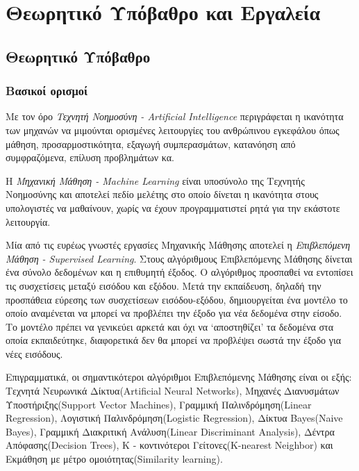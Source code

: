 \thispagestyle{plain}
\chapter{Θεωρητικό Υπόβαθρο και Εργαλεία}
\label{chap:3}

\section{Θεωρητικό Υπόβαθρο}
\label{sec:3.1}

\subsection{Βασικοί ορισμοί}
\label{subsec:3.1.1}

Με τον όρο \textit{Τεχνητή Νοημοσύνη - Artificial Intelligence} περιγράφεται η ικανότητα των μηχανών να μιμούνται ορισμένες λειτουργίες του ανθρώπινου εγκεφάλου όπως  μάθηση, προσαρμοστικότητα, εξαγωγή συμπερασμάτων, κατανόηση από συμφραζόμενα, επίλυση προβλημάτων κα.

 Η \textit{Μηχανική Μάθηση - Machine Learning} είναι υποσύνολο της Τεχνητής Νοημοσύνης και αποτελεί πεδίο μελέτης στο οποίο δίνεται η ικανότητα στους υπολογιστές να μαθαίνουν, χωρίς να έχουν προγραμματιστεί ρητά για την εκάστοτε λειτουργία. 
 
Μία από τις ευρέως γνωστές εργασίες Μηχανικής Μάθησης αποτελεί η \textit{Επιβλεπόμενη Μάθηση - Supervised Learning}. Στους αλγόριθμους Επιβλεπόμενης Μάθησης δίνεται ένα σύνολο δεδομένων και η επιθυμητή έξοδος. Ο αλγόριθμος προσπαθεί να εντοπίσει τις συσχετίσεις μεταξύ εισόδου και εξόδου. Μετά την εκπαίδευση, δηλαδή την προσπάθεια εύρεσης των συσχετίσεων εισόδου-εξόδου, δημιουργείται ένα μοντέλο το οποίο αναμένεται να μπορεί να προβλέπει την έξοδο για νέα δεδομένα στην είσοδο. Το μοντέλο πρέπει να γενικεύει αρκετά και όχι να ‘αποστηθίζει’ τα δεδομένα στα οποία εκπαιδεύτηκε, διαφορετικά δεν θα μπορεί να προβλέψει σωστά την έξοδο για νέες εισόδους. 


Επιγραμματικά, οι σημαντικότεροι αλγόριθμοι Επιβλεπόμενης Μάθησης είναι οι εξής: Τεχνητά Νευρωνικά Δίκτυα(Artificial Neural Networks), Μηχανές Διανυσμάτων Υποστήριξης(Support Vector Machines), Γραμμική Παλινδρόμηση(Linear Regression), Λογιστική Παλινδρόμηση(Logistic Regression), Δίκτυα Bayes(Naive Bayes), Γραμμική Διακριτική Ανάλυση(Linear Discriminant Analysis), Δέντρα Απόφασης(Decision Trees), Κ - κοντινότεροι Γείτονες(K-nearest Neighbor) και Εκμάθηση με μέτρο ομοιότητας(Similarity learning). 


